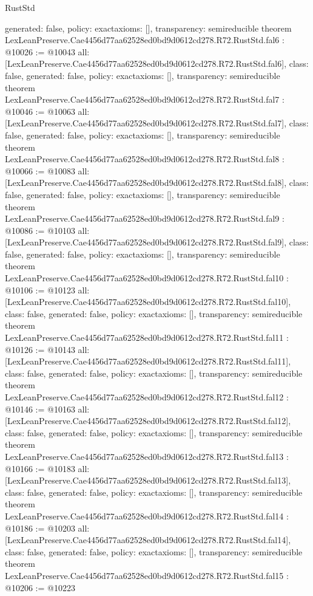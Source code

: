 \begin{lexlean}{RustStd}
\begin{coremodule}
{  generated: false,
  policy: exact{axioms: []},
  transparency: semireducible
}
theorem LexLeanPreserve.Cae4456d77aa62528ed0bd9d0612cd278.R72.RustStd.fal6 : @10026 := @10043 {
  all: [LexLeanPreserve.Cae4456d77aa62528ed0bd9d0612cd278.R72.RustStd.fal6],
  class: false,
  generated: false,
  policy: exact{axioms: []},
  transparency: semireducible
}
theorem LexLeanPreserve.Cae4456d77aa62528ed0bd9d0612cd278.R72.RustStd.fal7 : @10046 := @10063 {
  all: [LexLeanPreserve.Cae4456d77aa62528ed0bd9d0612cd278.R72.RustStd.fal7],
  class: false,
  generated: false,
  policy: exact{axioms: []},
  transparency: semireducible
}
theorem LexLeanPreserve.Cae4456d77aa62528ed0bd9d0612cd278.R72.RustStd.fal8 : @10066 := @10083 {
  all: [LexLeanPreserve.Cae4456d77aa62528ed0bd9d0612cd278.R72.RustStd.fal8],
  class: false,
  generated: false,
  policy: exact{axioms: []},
  transparency: semireducible
}
theorem LexLeanPreserve.Cae4456d77aa62528ed0bd9d0612cd278.R72.RustStd.fal9 : @10086 := @10103 {
  all: [LexLeanPreserve.Cae4456d77aa62528ed0bd9d0612cd278.R72.RustStd.fal9],
  class: false,
  generated: false,
  policy: exact{axioms: []},
  transparency: semireducible
}
theorem LexLeanPreserve.Cae4456d77aa62528ed0bd9d0612cd278.R72.RustStd.fal10 : @10106 := @10123 {
  all: [LexLeanPreserve.Cae4456d77aa62528ed0bd9d0612cd278.R72.RustStd.fal10],
  class: false,
  generated: false,
  policy: exact{axioms: []},
  transparency: semireducible
}
theorem LexLeanPreserve.Cae4456d77aa62528ed0bd9d0612cd278.R72.RustStd.fal11 : @10126 := @10143 {
  all: [LexLeanPreserve.Cae4456d77aa62528ed0bd9d0612cd278.R72.RustStd.fal11],
  class: false,
  generated: false,
  policy: exact{axioms: []},
  transparency: semireducible
}
theorem LexLeanPreserve.Cae4456d77aa62528ed0bd9d0612cd278.R72.RustStd.fal12 : @10146 := @10163 {
  all: [LexLeanPreserve.Cae4456d77aa62528ed0bd9d0612cd278.R72.RustStd.fal12],
  class: false,
  generated: false,
  policy: exact{axioms: []},
  transparency: semireducible
}
theorem LexLeanPreserve.Cae4456d77aa62528ed0bd9d0612cd278.R72.RustStd.fal13 : @10166 := @10183 {
  all: [LexLeanPreserve.Cae4456d77aa62528ed0bd9d0612cd278.R72.RustStd.fal13],
  class: false,
  generated: false,
  policy: exact{axioms: []},
  transparency: semireducible
}
theorem LexLeanPreserve.Cae4456d77aa62528ed0bd9d0612cd278.R72.RustStd.fal14 : @10186 := @10203 {
  all: [LexLeanPreserve.Cae4456d77aa62528ed0bd9d0612cd278.R72.RustStd.fal14],
  class: false,
  generated: false,
  policy: exact{axioms: []},
  transparency: semireducible
}
theorem LexLeanPreserve.Cae4456d77aa62528ed0bd9d0612cd278.R72.RustStd.fal15 : @10206 := @10223 {
}
\end{coremodule}
\end{lexlean}
